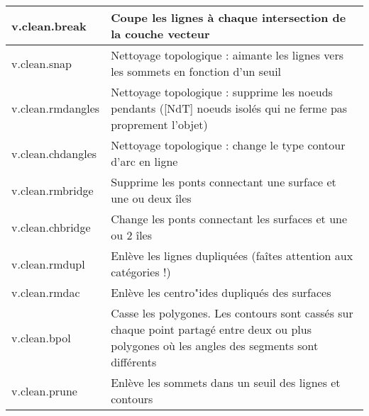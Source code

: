 \begin{table}[H]
{\begin{longtable}{|p{2.5cm}|p{11.5cm}|}
  \hline v.clean.break & Coupe les lignes à chaque intersection de la couche vecteur\\
  \hline v.clean.snap & Nettoyage topologique : aimante les lignes vers les sommets en fonction d'un seuil\\
  \hline v.clean.rmdangles & Nettoyage topologique : supprime les noeuds pendants ([NdT] noeuds isolés qui ne ferme pas proprement l'objet) \\
  \hline v.clean.chdangles & Nettoyage topologique : change le type contour d'arc en ligne \\
  \hline v.clean.rmbridge & Supprime les ponts connectant une surface et une ou deux îles\\
  \hline v.clean.chbridge & Change les ponts connectant les surfaces et une ou 2 îles \\
  \hline v.clean.rmdupl & Enlève les lignes dupliquées  (faîtes attention aux catégories !) \\
  \hline v.clean.rmdac & Enlève les centro"ides dupliqués des surfaces\\
  \hline v.clean.bpol & Casse les polygones. Les contours sont cassés sur chaque point partagé entre deux ou plus polygones où les angles des segments sont différents\\
  \hline v.clean.prune & Enlève les sommets dans un seuil des lignes et contours\\

\end{longtable}}
\end{table}
